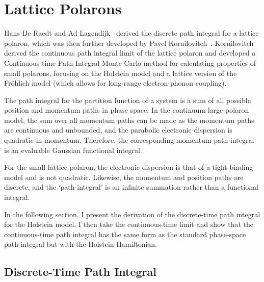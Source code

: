 \section{Lattice Polarons}
\label{sec:3-2}

Hans De Raedt and Ad Lagendijk~\cite{de_raedt_numerical_1983, de_raedt_monte_1985} derived the discrete path integral for a lattice polaron, which was then further developed by Pavel Kornilovitch~\cite{kornilovitch_polaron_1997, kornilovitch_continuous-time_1998, kornilovitch_ground-state_1999, kornilovitch_giant_1999, kornilovitch_band_2000, kornilovitch_feynmans_2004, kornilovitch_path_2007}. Kornilovitch derived the continuous path integral limit of the lattice polaron and developed a Continuous-time Path Integral Monte Carlo method for calculating properties of small polarons, focusing on the Holstein model and a lattice version of the Fr\"ohlich model (which allows for long-range electron-phonon coupling). 

The path integral for the partition function of a system is a sum of all possible position and momentum paths in phase space. In the continuum large-polaron model, the sum over all momentum paths can be made as the momentum paths are continuous and unbounded, and the parabolic electronic dispersion is quadratic in momentum. Therefore, the corresponding momentum path integral is an evaluable Gaussian functional integral.

For the small lattice polaron, the electronic dispersion is that of a tight-binding model and is not quadratic. Likewise, the momentum and position paths are discrete, and the `path-integral' is an infinite summation rather than a functional integral. 

In the following section, I present the derivation of the discrete-time path integral for the Holstein model. I then take the continuous-time limit and show that the continuous-time path integral has the same form as the standard phase-space path integral but with the Holstein Hamiltonian.

\subsection{Discrete-Time Path Integral}
\label{subsec:3-2-1}

